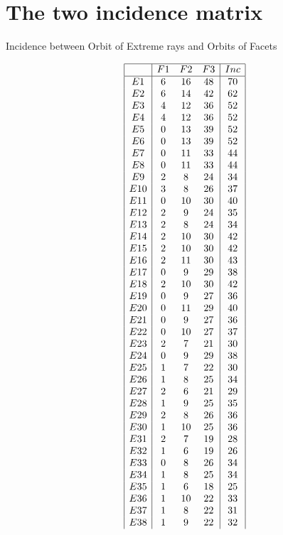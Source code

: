 \documentclass[12pt]{article}
\begin{document}
\section{The two incidence matrix}
Incidence between Orbit of Extreme rays and Orbits of Facets
\newpage
\begin{multicols}{3}
\begin{equation*}
\begin{array}{|c|ccc|c|}
\hline
&F1&F2&F3&Inc\\
\hline
E1&6&16&48&70\\
E2&6&14&42&62\\
E3&4&12&36&52\\
E4&4&12&36&52\\
E5&0&13&39&52\\
E6&0&13&39&52\\
E7&0&11&33&44\\
E8&0&11&33&44\\
E9&2&8&24&34\\
E10&3&8&26&37\\
E11&0&10&30&40\\
E12&2&9&24&35\\
E13&2&8&24&34\\
E14&2&10&30&42\\
E15&2&10&30&42\\
E16&2&11&30&43\\
E17&0&9&29&38\\
E18&2&10&30&42\\
E19&0&9&27&36\\
E20&0&11&29&40\\
E21&0&9&27&36\\
E22&0&10&27&37\\
E23&2&7&21&30\\
E24&0&9&29&38\\
E25&1&7&22&30\\
E26&1&8&25&34\\
E27&2&6&21&29\\
E28&1&9&25&35\\
E29&2&8&26&36\\
E30&1&10&25&36\\
E31&2&7&19&28\\
E32&1&6&19&26\\
E33&0&8&26&34\\
E34&1&8&25&34\\
E35&1&6&18&25\\
E36&1&10&22&33\\
E37&1&8&22&31\\
E38&1&9&22&32\\

\end{array}
\end{equation*}
\end{multicols}
\end{document}

